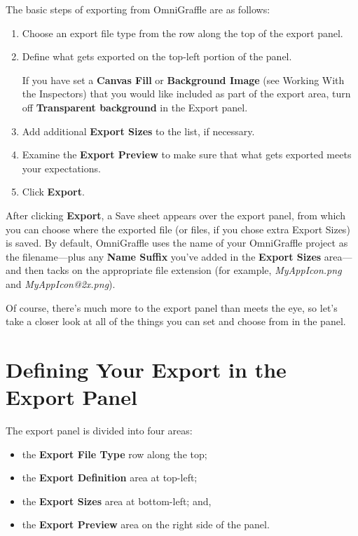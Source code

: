 \documentclass[../main.tex]{subfiles}
\begin{document}
The basic steps of exporting from OmniGraffle are as follows:

\begin{enumerate}
  \item Choose an export file type from the row along the top of the export panel.
  \item Define what gets exported on the top-left portion of the panel.

    \begin{ogtip}
      If you have set a \textbf{Canvas Fill} or \textbf{Background Image} (see Working With the
      Inspectors) that you would like included as part of the export area, turn off
      \textbf{Transparent background} in the Export panel.
    \end{ogtip}
  \item Add additional \textbf{Export Sizes} to the list, if necessary.
  \item Examine the \textbf{Export Preview} to make sure that what gets exported meets your
    expectations.
  \item Click \textbf{Export}.
\end{enumerate}

After clicking \textbf{Export}, a Save sheet appears over the export panel, from which you can
choose where the exported file (or files, if you chose extra Export Sizes) is saved. By
default, OmniGraffle uses the name of your OmniGraffle project as the filename---plus any
\textbf{Name Suffix} you've added in the \textbf{Export Sizes} area---and then tacks on the
appropriate file extension (for example, \textit{MyAppIcon.png} and
\textit{MyAppIcon@2x.png}).

Of course, there's much more to the export panel than meets the eye, so let's take a closer look
at all of the things you can set and choose from in the panel.

\section{Defining Your Export in the Export Panel}

The export panel is divided into four areas:

\begin{itemize}
  \item the \textbf{Export File Type} row along the top;
  \item the \textbf{Export Definition} area at top-left;
  \item the \textbf{Export Sizes} area at bottom-left; and,
  \item the \textbf{Export Preview} area on the right side of the panel.
\end{itemize}
\end{document}
